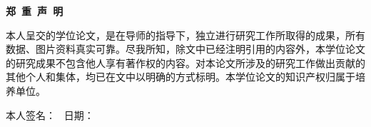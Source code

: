 \vbox{}
\vskip 1cm
\centerline{\songti{}\textbf{郑\ 重\ 声\ 明}}
\vskip 2cm

\songti{}
本人呈交的学位论文，是在导师的指导下，独立进行研究工作所取得的成果，所有数据、图片资料真实可靠。尽我所知，除文中已经注明引用的内容外，本学位论文的研究成果不包含他人享有著作权的内容。对本论文所涉及的研究工作做出贡献的其他个人和集体，均已在文中以明确的方式标明。本学位论文的知识产权归属于培养单位。

\vskip 3cm

本人签名： \qquad \quad \ 日期：



